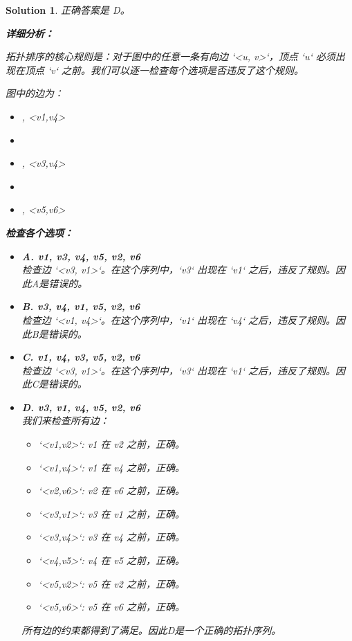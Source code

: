 \documentclass[UTF8]{report}
\newtheorem{solution}{Solution}
\theoremstyle{MyLineTheoremStyle} %
\theoremstyle{MyBlockTheoremStyle} %
\theoremstyle{MySubsubsectionStyle} %
\begin{document}
\begin{solution}
正确答案是 D。

\textbf{详细分析：}

拓扑排序的核心规则是：对于图中的任意一条有向边 `<u, v>`，顶点 `u` 必须出现在顶点 `v` 之前。我们可以逐一检查每个选项是否违反了这个规则。

图中的边为：
\begin{itemize}
    \item <v1,v2>, <v1,v4>
    \item <v2,v6>
    \item <v3,v1>, <v3,v4>
    \item <v4,v5>
    \item <v5,v2>, <v5,v6>
\end{itemize}

\textbf{检查各个选项：}
\begin{itemize}
    \item \textbf{A. v1, v3, v4, v5, v2, v6} \\
    检查边 `<v3, v1>`。在这个序列中，`v3` 出现在 `v1` 之后，违反了规则。因此A是错误的。

    \item \textbf{B. v3, v4, v1, v5, v2, v6} \\
    检查边 `<v1, v4>`。在这个序列中，`v1` 出现在 `v4` 之后，违反了规则。因此B是错误的。

    \item \textbf{C. v1, v4, v3, v5, v2, v6} \\
    检查边 `<v3, v1>`。在这个序列中，`v3` 出现在 `v1` 之后，违反了规则。因此C是错误的。

    \item \textbf{D. v3, v1, v4, v5, v2, v6} \\
    我们来检查所有边：
    \begin{itemize}
        \item `<v1,v2>`: v1 在 v2 之前，正确。
        \item `<v1,v4>`: v1 在 v4 之前，正确。
        \item `<v2,v6>`: v2 在 v6 之前，正确。
        \item `<v3,v1>`: v3 在 v1 之前，正确。
        \item `<v3,v4>`: v3 在 v4 之前，正确。
        \item `<v4,v5>`: v4 在 v5 之前，正确。
        \item `<v5,v2>`: v5 在 v2 之前，正确。
        \item `<v5,v6>`: v5 在 v6 之前，正确。
    \end{itemize}
    所有边的约束都得到了满足。因此D是一个正确的拓扑序列。
\end{itemize}


\end{solution}
\end{document}
